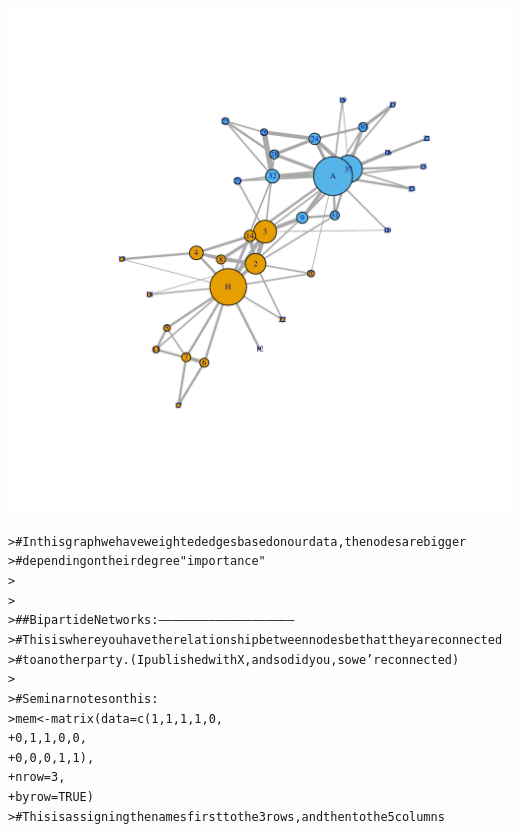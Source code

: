 \documentclass[12pt]{article}\usepackage[]{graphicx}\usepackage[]{color}
\makeatletter
\newcommand{\hlnum}[1]{\textcolor[rgb]{0.82,0.78,0.62}{#1}}%
\newcommand{\hlcom}[1]{\textcolor[rgb]{0.404,0.408,0.42}{#1}}%
\newcommand{\hlstd}[1]{\textcolor[rgb]{0.882,0.878,0.898}{#1}}%
\newcommand{\hlkwb}[1]{\textcolor[rgb]{0.902,0.675,0.196}{#1}}%
\newcommand{\hlkwc}[1]{\textcolor[rgb]{0.812,0.522,0.388}{#1}}%
\newcommand{\hlkwd}[1]{\textcolor[rgb]{0.733,0.388,0.812}{#1}}%
\newenvironment{kframe}{%
 \def\at@end@of@kframe{}%
 \ifinner\ifhmode%
  \def\at@end@of@kframe{\end{minipage}}%
  \begin{minipage}{\columnwidth}%
 \fi\fi%
 \def\FrameCommand##1{\hskip\@totalleftmargin \hskip-\fboxsep
 \colorbox{shadecolor}{##1}\hskip-\fboxsep
     \hskip-\linewidth \hskip-\@totalleftmargin \hskip\columnwidth}%
 \MakeFramed {\advance\hsize-\width
   \@totalleftmargin\z@ \linewidth\hsize
   \@setminipage}}%
 {\par\unskip\endMakeFramed%
 \at@end@of@kframe}
\newenvironment{knitrout}{}{} %
\makeatother
\begin{document}
\begin{flushleft}
\begin{center}
\begin{knitrout}
\begin{kframe}
\begin{alltt}
\end{alltt}
\end{kframe}
\includegraphics[width=6in]{figure/Network_Basics-4} 
\begin{kframe}\begin{alltt}
\hlstd{> }\hlcom{# In this graph we have weighted edges based on our data, the nodes are bigger}
\hlstd{> }\hlcom{#   depending on their degree "importance"}
\hlstd{> }
\hlstd{> }
\hlstd{> }\hlcom{## Bipartide Networks: ---------------------------------------------------------}
\hlstd{> }\hlcom{# This is where you have the relationship between nodes be that they are connected}
\hlstd{> }\hlcom{#   to another party. (I published with X, and so did you, so we're connected)}
\hlstd{> }
\hlstd{> }\hlcom{# Seminar notes on this:}
\hlstd{> }\hlstd{mem} \hlkwb{<-} \hlkwd{matrix}\hlstd{(}\hlkwc{data} \hlstd{=} \hlkwd{c}\hlstd{(}\hlnum{1}\hlstd{,}\hlnum{1}\hlstd{,}\hlnum{1}\hlstd{,}\hlnum{1}\hlstd{,}\hlnum{0}\hlstd{,}
\hlstd{+ }                      \hlnum{0}\hlstd{,}\hlnum{1}\hlstd{,}\hlnum{1}\hlstd{,}\hlnum{0}\hlstd{,}\hlnum{0}\hlstd{,}
\hlstd{+ }                      \hlnum{0}\hlstd{,}\hlnum{0}\hlstd{,}\hlnum{0}\hlstd{,}\hlnum{1}\hlstd{,}\hlnum{1}\hlstd{),}
\hlstd{+ }              \hlkwc{nrow} \hlstd{=} \hlnum{3}\hlstd{,}
\hlstd{+ }              \hlkwc{byrow} \hlstd{=} \hlnum{TRUE}\hlstd{)}
\hlstd{> }\hlcom{# This is assigning the names first to the 3 rows, and then to the 5 columns}

\end{alltt}
\end{kframe}
\end{knitrout}
\end{center}
\end{flushleft}
\end{document}
